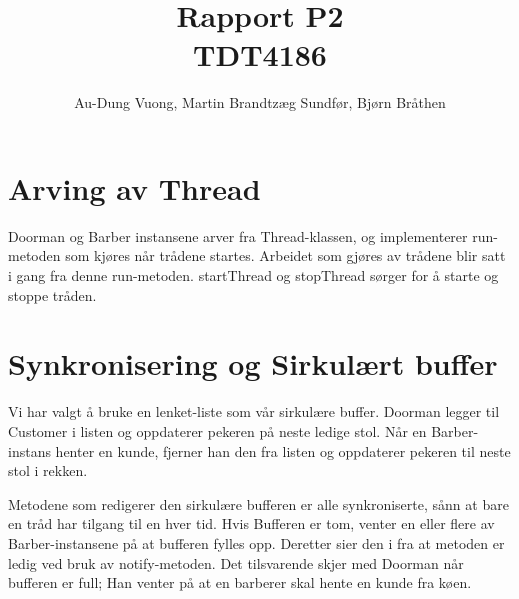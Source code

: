 \documentclass{article}
\begin{document}
\title{Rapport P2 \\ TDT4186}
\author{Au-Dung Vuong, Martin Brandtzæg Sundfør, Bjørn Bråthen}

\maketitle

\section*{Arving av Thread}

Doorman og Barber instansene arver fra Thread-klassen, og implementerer run-metoden som kjøres når trådene startes.
Arbeidet som gjøres av trådene blir satt i gang fra denne run-metoden. startThread og stopThread sørger for å starte og stoppe tråden.

\section*{Synkronisering og Sirkulært buffer}

Vi har valgt å bruke en lenket-liste som vår sirkulære buffer. Doorman legger til Customer i listen og oppdaterer pekeren på neste ledige stol. Når en Barber-instans henter en kunde, fjerner han den fra listen og oppdaterer pekeren til neste stol i rekken.

Metodene som redigerer den sirkulære bufferen er alle synkroniserte, sånn at bare en tråd har tilgang til en hver tid. Hvis Bufferen er tom, venter en eller flere av Barber-instansene på at bufferen fylles opp. Deretter sier den i fra at metoden er ledig ved bruk av notify-metoden. Det tilsvarende skjer med Doorman når bufferen er full; Han venter på at en barberer skal hente en kunde fra køen.
\end{document}
